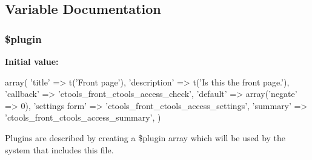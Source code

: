 \subsection{Variable Documentation}
\hypertarget{front_8inc_ada8a7130088351710bb02ed622d6bf65}{
\subsubsection[{\$plugin}]{\setlength{\rightskip}{0pt plus 5cm}\$plugin}}
\label{front_8inc_ada8a7130088351710bb02ed622d6bf65}
{\bfseries Initial value:}
\begin{DoxyCode}
 array(
  'title' => t('Front page'),
  'description' => t('Is this the front page.'),
  'callback' => 'ctools_front_ctools_access_check',
  'default' => array('negate' => 0),
  'settings form' => 'ctools_front_ctools_access_settings',
  'summary' => 'ctools_front_ctools_access_summary',
)
\end{DoxyCode}
Plugins are described by creating a \$plugin array which will be used by the system that includes this file. 
